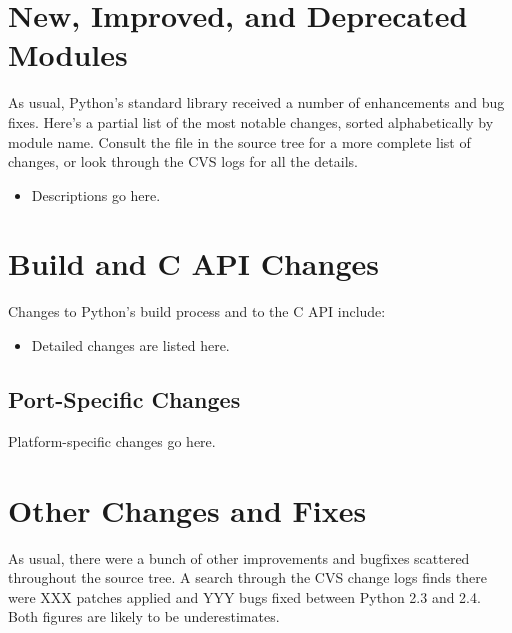 \documentclass{howto}
\begin{document}
\section{New, Improved, and Deprecated Modules}

As usual, Python's standard library received a number of enhancements and
bug fixes.  Here's a partial list of the most notable changes, sorted
alphabetically by module name. Consult the
 file in the source tree for a more
complete list of changes, or look through the CVS logs for all the
details.

\begin{itemize}

\item Descriptions go here.

\end{itemize}




\section{Build and C API Changes}

Changes to Python's build process and to the C API include:

\begin{itemize}

\item Detailed changes are listed here.

\end{itemize}


\subsection{Port-Specific Changes}

Platform-specific changes go here.


\section{Other Changes and Fixes \label{section-other}}

As usual, there were a bunch of other improvements and bugfixes
scattered throughout the source tree.  A search through the CVS change
logs finds there were XXX patches applied and YYY bugs fixed between
Python 2.3 and 2.4.  Both figures are likely to be underestimates.
\end{document}
